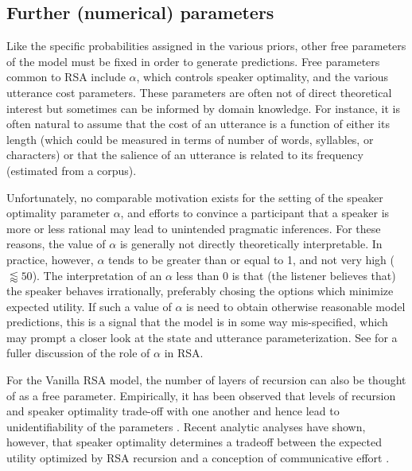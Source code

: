 \documentclass{sp}
\newcommand{\mht}[1]{\textcolor{purple}{[mht: #1]}}
\begin{document}

%


\subsection{Further (numerical) parameters}

Like the specific probabilities assigned in the various priors, other free parameters of the model must be fixed in order to generate predictions. Free parameters common to RSA include $\alpha$, which controls speaker optimality, and the various utterance cost parameters. These parameters are often not of direct theoretical interest but sometimes can be informed by domain knowledge. For instance, it is often natural to assume that the cost of an utterance is a function of either its length  (which could be measured in terms of number of words, syllables, or characters) or that the salience of an utterance is related to its frequency (estimated from a corpus).

Unfortunately,  no comparable motivation exists for the setting of the speaker optimality parameter $\alpha$, and efforts to convince a participant that a speaker is more or less rational may lead to unintended pragmatic inferences. For these reasons, the value of $\alpha$ is generally not directly theoretically interpretable. In practice, however, $\alpha$ tends to be greater than or equal to 1, and not very high ($\lessapprox 50$). The interpretation of an $\alpha$ less than 0 is that (the listener believes that) the speaker behaves irrationally, preferably chosing the options which minimize expected utility. If such a value of $\alpha$ is need to obtain otherwise reasonable model predictions, this is a signal that the model is in some way mis-specified, which may prompt a closer look at the state and utterance parameterization.  See \cite{zaslavsky2020rate} for a fuller discussion of the role of $\alpha$ in RSA.

For the Vanilla RSA model, the number of layers of recursion can also be thought of as a free parameter. Empirically, it has been observed that levels of recursion and speaker optimality trade-off with one another  and hence lead to unidentifiability of the parameters \citep{frank2016rational}. Recent analytic analyses have shown, however, that speaker optimality determines a tradeoff between the expected utility optimized by RSA recursion and a conception of communicative effort \citep{zaslavsky2020rate}.
\end{document}
